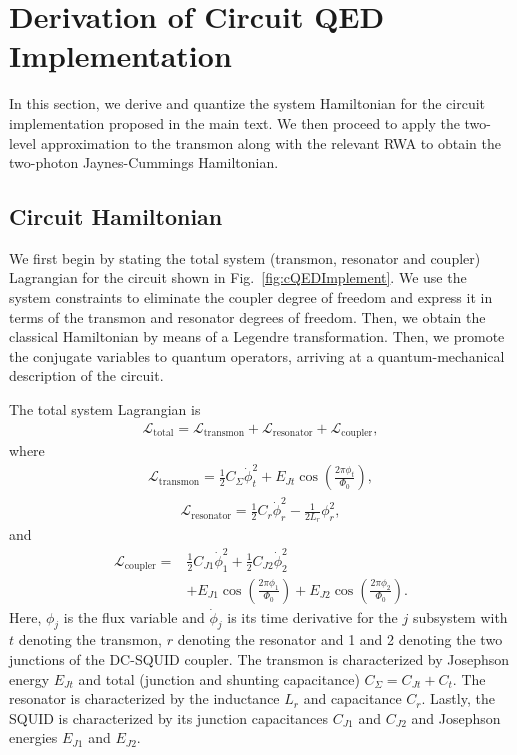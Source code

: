 \section{Derivation of Circuit QED Implementation\label{app:cQED}}
In this section, we derive and quantize the system Hamiltonian for the circuit implementation proposed in the main text. We then proceed to apply the two-level approximation to the transmon along with the relevant RWA to obtain the two-photon Jaynes-Cummings Hamiltonian.

\subsection{Circuit Hamiltonian}

We first begin by stating the total system (transmon, resonator and coupler) Lagrangian for the circuit shown in Fig.~\ref{fig:cQEDImplement}. We use the system constraints to eliminate the coupler degree of freedom and express it in terms of the transmon and resonator degrees of freedom. Then, we obtain the classical Hamiltonian by means of a Legendre transformation. Then, we promote the conjugate variables to quantum operators, arriving at a quantum-mechanical description of the circuit.


The total system Lagrangian is \cite{CWilson2}
\begin{align}
    \mathcal{L}_{\text{total}}=\mathcal{L}_{\text{transmon}}+\mathcal{L}_{\text{resonator}}+\mathcal{L}_{\text{coupler}},
\end{align}
where
\begin{align}
    \mathcal{L}_{\text{transmon}}=\frac{1}{2}C_{\Sigma}\dot{\phi}_t^2 + E_{Jt}\cos(\frac{2\pi \phi_t}{\Phi_0}),
\end{align}
\begin{align}
    \mathcal{L}_{\text{resonator}}=\frac{1}{2}C_{r}\dot{\phi}_r^2 - \frac{1}{2L_r}\phi_r^2,
\end{align}
and
\begin{align}
    \mathcal{L}_{\text{coupler}}=&\frac{1}{2}C_{J1}\dot{\phi}_1^2 + \frac{1}{2}C_{J2}\dot{\phi}_2^2 \nonumber \\ & + E_{J1}\cos(\frac{2\pi \phi_1}{\Phi_0}) + E_{J2}\cos(\frac{2\pi \phi_2}{\Phi_0}). \label{eq:CouplerLagrangianOriginal}
\end{align}
Here, $\phi_j$ is the flux variable and $\dot{\phi}_j$ is its time derivative for the $j$ subsystem with $t$ denoting the transmon, $r$ denoting the resonator and 1 and 2 denoting the two junctions of the DC-SQUID coupler. The transmon is characterized by Josephson energy $E_{Jt}$ and total (junction and shunting capacitance) $C_{\Sigma}=C_{Jt}+C_{t}$. The resonator is characterized by the inductance $L_r$ and capacitance $C_r$. Lastly, the SQUID is characterized by its junction capacitances $C_{J1}$ and $C_{J2}$ and Josephson energies $E_{J1}$ and $E_{J2}$.

